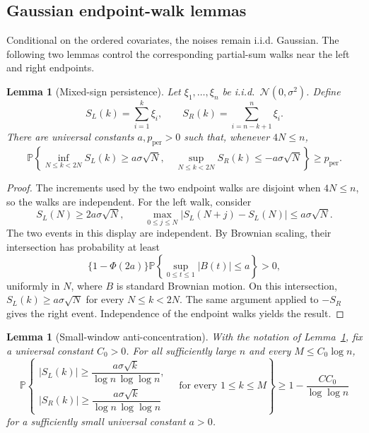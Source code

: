 \documentclass[11pt]{article}
\theoremstyle{plain}
\newtheorem{lemma}[theorem]{Lemma}
\theoremstyle{definition}
\theoremstyle{remark}
\theoremstyle{plain}
\renewcommand{\P}{\mathbb{P}}
\newcommand{\1}{\mathbbm{1}}
\begin{document}
\subsection{Gaussian endpoint-walk lemmas}

Conditional on the ordered covariates, the noises remain i.i.d. Gaussian.
The following two lemmas control the corresponding partial-sum walks near
the left and right endpoints.

\begin{lemma}[Mixed-sign persistence]
\label{lem:mls-mixed-persistence}
Let $\xi_1,\ldots,\xi_n$ be i.i.d.\ $\mathcal N(0,\sigma^2)$. Define
\[
 S_L(k)=\sum_{i=1}^k\xi_i,
 \qquad
 S_R(k)=\sum_{i=n-k+1}^n\xi_i.
\]
There are universal constants $a,p_{\mathrm{per}}>0$ such that, whenever
$4N\le n$,
\[
 \P\left\{
 \inf_{N\le k<2N}S_L(k)\ge a\sigma\sqrt N,\quad
 \sup_{N\le k<2N}S_R(k)\le-a\sigma\sqrt N
 \right\}
 \ge p_{\mathrm{per}}.
\]
\end{lemma}

\begin{proof}
The increments used by the two endpoint walks are disjoint when
$4N\le n$, so the walks are independent. For the left walk,
consider
\[
 S_L(N)\ge2a\sigma\sqrt N,
 \qquad
 \max_{0\le j\le N}|S_L(N+j)-S_L(N)|\le a\sigma\sqrt N.
\]
The two events in this display are independent. By Brownian scaling, their
intersection has probability at least
\[
 \{1-\Phi(2a)\}
 \P\left\{\sup_{0\le t\le1}|B(t)|\le a\right\}>0,
\]
uniformly in $N$, where $B$ is standard Brownian motion. On this
intersection, $S_L(k)\ge a\sigma\sqrt N$ for every $N\le k<2N$.
The same argument applied to $-S_R$ gives the right event. Independence of
the endpoint walks yields the result.
\end{proof}

\begin{lemma}[Small-window anti-concentration]
\label{lem:mls-small-window}
With the notation of Lemma~\ref{lem:mls-mixed-persistence}, fix a universal
constant $C_0>0$. For all sufficiently large $n$ and every
$M\le C_0\log n$,
\[
 \P\left\{
 \begin{array}{l}
 |S_L(k)|\ge
 \dfrac{a\sigma\sqrt{k}}{\log n\,\log\log n},\\[5pt]
 |S_R(k)|\ge
 \dfrac{a\sigma\sqrt{k}}{\log n\,\log\log n}
 \end{array}
 \quad\text{for every }1\le k\le M
 \right\}
 \ge1-\frac{CC_0}{\log\log n}
\]
for a sufficiently small universal constant $a>0$.
\end{lemma}
\end{document}
